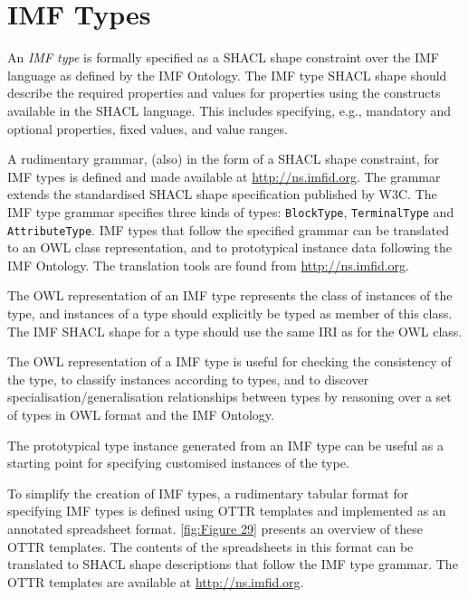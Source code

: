 \section{IMF Types}
\label{ch:types}

An \emph{IMF type} is formally specified as a SHACL shape constraint
over the IMF language as defined by the IMF Ontology. The IMF type
SHACL shape should describe the required properties and values for
properties using the constructs available in the SHACL language. This
includes specifying, e.g., mandatory and optional properties,
fixed values, and value ranges.

A rudimentary grammar, (also) in the form of a SHACL shape constraint,
for IMF types is defined and made available at
\url{http://ns.imfid.org}. The grammar extends the standardised SHACL
shape specification published by W3C. The IMF type grammar specifies
three kinds of types: \texttt{BlockType}, \texttt{TerminalType} and
\texttt{AttributeType}. IMF types that follow the specified grammar
can be translated to an OWL class representation, and to
prototypical instance data following the IMF Ontology. The translation
tools are found from \url{http://ns.imfid.org}.

The OWL representation of an IMF type represents the class of instances
of the type, and instances of a type should explicitly be typed as
member of this class. The IMF SHACL shape for a type should use the
same IRI as for the OWL class.

The OWL representation of a IMF type is useful for checking the
consistency of the type, to classify instances according to types, and
to discover specialisation/generalisation relationships between types
by reasoning over a set of types in OWL format and the IMF Ontology.

The prototypical type instance generated from an IMF type can be
useful as a starting point for specifying customised instances of the
type.

To simplify the creation of IMF types, a rudimentary tabular format
for specifying IMF types is defined using OTTR templates and
implemented as an annotated spreadsheet format.  \autoref{fig:Figure
  29} presents an overview of these OTTR templates.  The contents of
the spreadsheets in this format can be translated to SHACL shape
descriptions that follow the IMF type grammar. The OTTR templates are
available at \url{http://ns.imfid.org}. 

